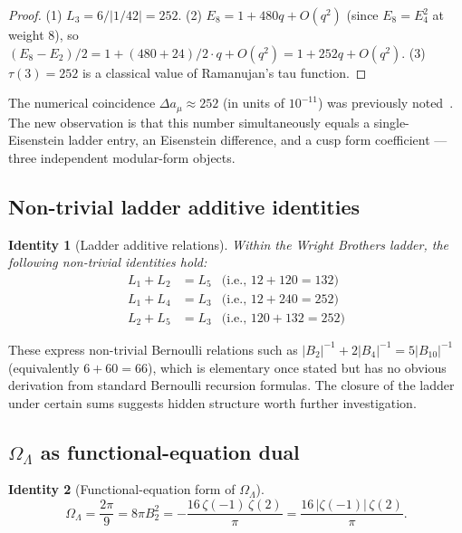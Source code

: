 \documentclass[11pt,a4paper]{article}
\newtheorem{identity}{Identity}
\begin{document}
\begin{proof}
(1) $L_3 = 6/|1/42| = 252$.
(2) $E_8 = 1 + 480q + O(q^2)$ (since $E_8 = E_4^2$ at weight 8),
so $(E_8 - E_2)/2 = 1 + (480+24)/2 \cdot q + O(q^2) = 1 + 252q + O(q^2)$.
(3) $\tau(3) = 252$ is a classical value of Ramanujan's tau function.
\end{proof}

The numerical coincidence $\Delta a_\mu \approx 252$ (in units of
$10^{-11}$) was previously noted~\cite{wb-prior}. The new observation
is that this number simultaneously equals a single-Eisenstein ladder
entry, an Eisenstein difference, and a cusp form coefficient ---
three independent modular-form objects.

\subsection{Non-trivial ladder additive identities}

\begin{identity}[Ladder additive relations]
\label{id:additive}
Within the Wright Brothers ladder, the following non-trivial
identities hold:
\begin{align}
L_1 + L_2 &= L_5 &\text{(i.e., $12 + 120 = 132$)} \\
L_1 + L_4 &= L_3 &\text{(i.e., $12 + 240 = 252$)} \\
L_2 + L_5 &= L_3 &\text{(i.e., $120 + 132 = 252$)}
\end{align}
\end{identity}

These express non-trivial Bernoulli relations such as
$|B_2|^{-1} + 2|B_4|^{-1} = 5|B_{10}|^{-1}$ (equivalently
$6 + 60 = 66$), which is elementary once stated but has no
obvious derivation from standard Bernoulli recursion formulas.
The closure of the ladder under certain sums suggests hidden
structure worth further investigation.

\subsection{$\Omega_\Lambda$ as functional-equation dual}

\begin{identity}[Functional-equation form of $\Omega_\Lambda$]
\label{id:omega}
\begin{equation}
\Omega_\Lambda = \frac{2\pi}{9} = 8\pi B_2^2 = -\frac{16\,\zeta(-1)\,\zeta(2)}{\pi}
= \frac{16\,|\zeta(-1)|\,\zeta(2)}{\pi}.
\end{equation}
\end{identity}
\end{document}
